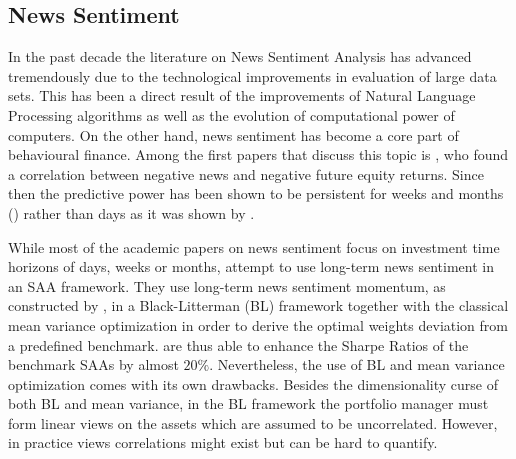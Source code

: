 \subsection{News Sentiment}

In the past decade the literature on News Sentiment Analysis has advanced tremendously due to the technological improvements in evaluation of large data sets. This has been a direct result of the improvements of Natural Language Processing algorithms as well as the evolution of computational power of computers. On the other hand, news sentiment has become a core part of behavioural finance. Among the first papers that discuss this topic is \cite{tetlock2007giving}, who found a correlation between negative news and negative future equity returns. Since then the predictive power has been shown to be persistent for weeks and months (\citet{uhl2015s}) rather than days as it was shown by \citet{tetlock2007giving}.

While most of the academic papers on news sentiment focus on investment time horizons of days, weeks or months, \citet{enhPortOpti} attempt to use long-term news sentiment in an SAA framework. They use long-term news sentiment momentum, as constructed by \citeauthor{uhl2015s}, in a Black-Litterman (BL) framework together with the classical mean variance optimization in order to derive the optimal weights deviation from a predefined benchmark. \citeauthor{enhPortOpti} are thus able to enhance the Sharpe Ratios of the benchmark SAAs by almost $20\%$. Nevertheless, the use of BL and  mean variance optimization comes with its own drawbacks. Besides the dimensionality curse of both BL and mean variance, in the BL framework the portfolio manager must form linear views on the assets which are assumed to be uncorrelated. However, in practice views correlations might exist but can be hard to quantify. 







 